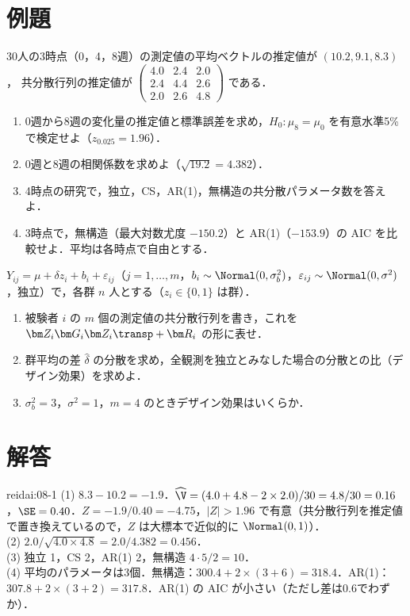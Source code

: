 \section{例題}\label{sec:08-ex}
\begin{reidai}[反復測定]\label{reidai:08-1}
30人の3時点（0，4，8週）の測定値の平均ベクトルの推定値が $(10.2,9.1,8.3)$，
共分散行列の推定値が $\begin{pmatrix}4.0&2.4&2.0\\2.4&4.4&2.6\\2.0&2.6&4.8\end{pmatrix}$ である．
\begin{enumerate}[label=(\arabic*)]
\item 0週から8週の変化量の推定値と標準誤差を求め，$H_0:\mu_8=\mu_0$ を有意水準5\%で検定せよ（$z_{0.025}=1.96$）．
\item 0週と8週の相関係数を求めよ（$\sqrt{19.2}=4.382$）．
\item 4時点の研究で，独立，CS，AR(1)，無構造の共分散パラメータ数を答えよ．
\item 3時点で，無構造（最大対数尤度 $-150.2$）と AR(1)（$-153.9$）の AIC を比較せよ．平均は各時点で自由とする．
\end{enumerate}
\end{reidai}

\begin{reidai}[変量切片モデル]\label{reidai:08-2}
$Y_{ij}=\mu+\delta z_i+b_i+\varepsilon_{ij}$（$j=1,\dots,m$，$b_i\sim\Normal(0,\sigma_b^2)$，$\varepsilon_{ij}\sim\Normal(0,\sigma^2)$，独立）で，各群 $n$ 人とする（$z_i\in\{0,1\}$ は群）．
\begin{enumerate}[label=(\arabic*)]
\item 被験者 $i$ の $m$ 個の測定値の共分散行列を書き，これを $\bm Z_i\bm G_i\bm Z_i\transp+\bm R_i$ の形に表せ．
\item 群平均の差 $\hat\delta$ の分散を求め，全観測を独立とみなした場合の分散との比（デザイン効果）を求めよ．
\item $\sigma_b^2=3$，$\sigma^2=1$，$m=4$ のときデザイン効果はいくらか．
\end{enumerate}
\end{reidai}

\section{解答}\label{sec:08-sol}
\begin{kaitou}{reidai:08-1}
(1) $8.3-10.2=-1.9$．$\widehat\V=(4.0+4.8-2\times2.0)/30=4.8/30=0.16$，$\SE=0.40$．$Z=-1.9/0.40=-4.75$，$|Z|>1.96$ で有意（共分散行列を推定値で置き換えているので，$Z$ は大標本で近似的に $\Normal(0,1)$）．\\
(2) $2.0/\sqrt{4.0\times4.8}=2.0/4.382=0.456$．\\
(3) 独立 1，CS 2，AR(1) 2，無構造 $4\cdot5/2=10$．\\
(4) 平均のパラメータは3個．無構造：$300.4+2\times(3+6)=318.4$．AR(1)：$307.8+2\times(3+2)=317.8$．AR(1) の AIC が小さい（ただし差は0.6でわずか）．
\end{kaitou}

